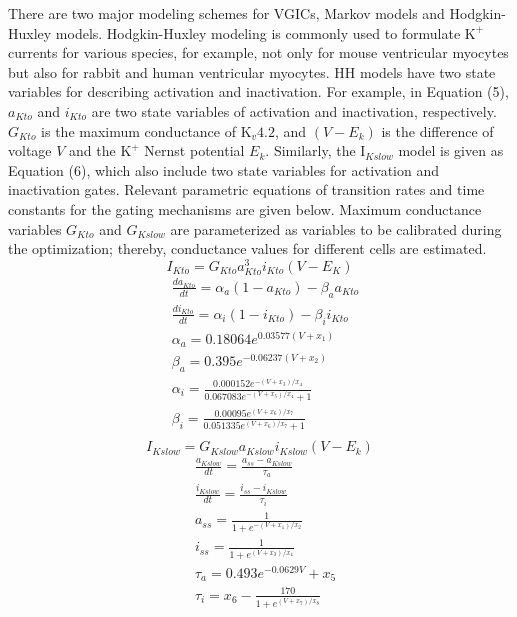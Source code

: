 \documentclass[journal]{IEEEtran}
\begin{document}
There are two major modeling schemes for VGICs, Markov models and Hodgkin-Huxley models. Hodgkin-Huxley modeling is commonly used to formulate $\text{K}^{+}$ currents for various species, for example, not only for mouse ventricular myocytes but also for rabbit and human ventricular myocytes. HH models have two state variables for describing activation and inactivation. For example, in Equation (5), $a_{Kto}$ and $i_{Kto}$ are two state variables of activation and inactivation, respectively. $G_{Kto}$ is the maximum conductance of $\text{K}_{v}4.2$, and $(V-E_k)$ is the difference of voltage $V$ and the $\text{K}^{+}$ Nernst potential $E_k$. Similarly, the $\text{I}_{Kslow}$ model is given as Equation (6), which also include two state variables for activation and inactivation gates. Relevant parametric equations of transition rates and time constants for the gating mechanisms are given below. Maximum conductance variables $G_{Kto}$ and $G_{Kslow}$ are parameterized as variables to be calibrated during the optimization; thereby, conductance values for different cells are estimated.
\begin{equation}
    I_{Kto} = G_{Kto}a_{Kto}^{3}i_{Kto}(V-E_K)
\end{equation}
\begin{align*}
    &\frac{da_{Kto}}{dt} = \alpha_{a}(1-a_{Kto}) - \beta_{a}a_{Kto} \\
    & \frac{di_{Kto}}{dt} = \alpha_i(1-i_{Kto}) - \beta_i i_{Kto} \\
    &\alpha_a = 0.18064 e^{0.03577(V+x_1)} \\
    &\beta_a = 0.395 e^{-0.06237(V+x_2)} \\
    &\alpha_i = \frac{0.000152 e^{-(V+x_3)/x_4}}{0.067083 e^{-(V + x_5)/x_4} + 1} \\
    &\beta_i = \frac{0.00095 e^{(V+x_6)/x_7}}{0.051335 e^{(V+x_6)/x_7} + 1} \\
\end{align*}
\begin{equation}
    I_{Kslow} = G_{Kslow}a_{Kslow}i_{Kslow}(V-E_k)
\end{equation}
\begin{align*}
    &\frac{a_{Kslow}}{dt} = \frac{a_{ss}-a_{Kslow}}{\tau_{a}} \\
    &\frac{i_{Kslow}}{dt} = \frac{i_{ss}-i_{Kslow}}{\tau_{i}} \\
    &a_{ss} = \frac{1}{1+e^{-(V+x_1)/x_2}} \\
    &i_{ss} = \frac{1}{1+e^{(V+x_3)/x_4}} \\
    &\tau_{a} = 0.493 e^{-0.0629V}+x_5 \\
    &\tau_{i} = x_6 - \frac{170}{1+e^{(V+x_7)/x_8}}
\end{align*}
\end{document}
